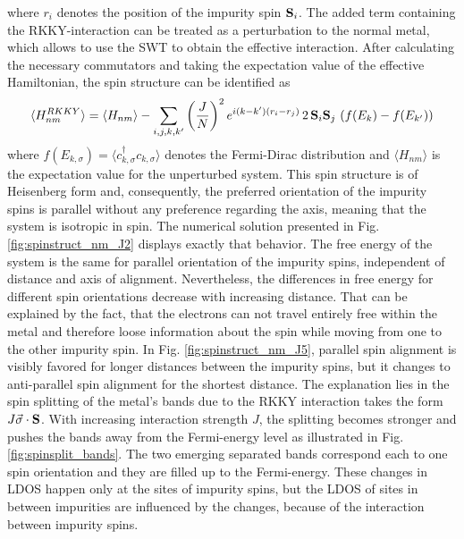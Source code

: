 where $r_i$ denotes the position of the impurity spin $\vb{S}_i$.
The added term containing the RKKY-interaction can be treated as a perturbation to the normal metal, which allows to use the SWT to obtain the effective interaction. \newline
After calculating the necessary commutators and taking the expectation value of the effective Hamiltonian, the spin structure can be identified as
\begin{align}
    \langle H^{RKKY}_{nm} \rangle = \langle H_{nm} \rangle - \sum_{i,j,k,k'} \left( \frac{J}{N}\right)^2 e^{i(k-k')(r_i-r_j)} \,2 \,\vb{S}_i \vb{S}_j \, \left(f(E_{k}) - f(E_{k'})\right)
\end{align}
where $f(E_{k,\sigma}) = \langle c^{\dag}_{k,\sigma}c_{k,\sigma} \rangle $ denotes the Fermi-Dirac distribution and $\langle H_{nm}\rangle$ is the expectation value for the unperturbed system.
This spin structure is of Heisenberg form and, consequently, the preferred orientation of the impurity spins is parallel without any preference regarding the axis, meaning that the system is isotropic in spin. \newline
The numerical solution presented in Fig. \ref{fig:spinstruct_nm_J2} displays exactly that behavior. 
The free energy of the system is the same for parallel orientation of the impurity spins, independent of distance and axis of alignment.
Nevertheless, the differences in free energy for different spin orientations decrease with increasing distance.
That can be explained by the fact, that the electrons can not travel entirely free within the metal and therefore loose information about the spin while moving from one to the other impurity spin. \newline
In Fig. \ref{fig:spinstruct_nm_J5}, parallel spin alignment is visibly favored for longer distances between the impurity spins, but it changes to anti-parallel spin alignment for the shortest distance.
The explanation lies in the spin splitting of the metal's bands due to the RKKY interaction takes the form $J\Vec{\sigma}\cdot\vb{S}$.
With increasing interaction strength $J$, the splitting becomes stronger and pushes the bands away from the Fermi-energy level as illustrated in Fig. \ref{fig:spinsplit_bands}.
The two emerging separated bands correspond each to one spin orientation and they are filled up to the Fermi-energy. \newline
These changes in LDOS happen only at the sites of impurity spins, but the LDOS of sites in between impurities are influenced by the changes, because of the interaction between impurity spins.

